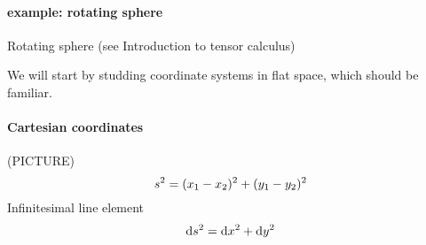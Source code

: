 \documentclass[
    a4paper,                                               %
    oneside,                                               %
    12pt,                                                  %
    headsepline,                                           %
    xcolor=dvipsnames
    ]{scrreprt}
\theoremstyle{definition}
\theoremstyle{remark}
\begin{document}
    	\paragraph{example: rotating sphere}
    	Rotating sphere (see Introduction to tensor calculus)
    	\par
    	We will start by studding coordinate systems in flat space, which should be familiar.
    	\paragraph{Cartesian coordinates} 
    	(PICTURE)
    	\begin{equation*}
    		s^2=(x_1-x_2)^2+(y_1-y_2)^2\\
    	\end{equation*}
    	Infinitesimal line element 
    	\begin{equation}
    	\dif s^2=\dif x^2+\dif y^2  \label{eq:cartline}
    	\end{equation}
\end{document}
